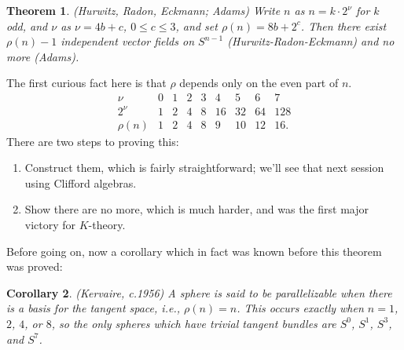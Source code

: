 \documentclass{article}
\newtheorem{thm}{Theorem}[section]
\newtheorem{cor}[thm]{Corollary}
\begin{document}
\begin{thm}(Hurwitz, Radon, Eckmann; Adams)
Write $n$ as $n = k \cdot 2^\nu$ for $k$ odd, and $\nu$ as $\nu = 4b + c$, $0 \le c \le 3$, and set $\rho(n) = 8b + 2^c$.  Then there exist $\rho(n) - 1$ independent vector fields on $S^{n-1}$ (Hurwitz-Radon-Eckmann) and no more (Adams).
\end{thm}
The first curious fact here is that $\rho$ depends only on the even part of $n$.
\[\begin{array}{c|cccccccc}
\nu & 0 & 1 & 2 & 3 & 4 & 5 & 6 & 7 \\
2^\nu & 1 & 2 & 4 & 8 & 16 & 32 & 64 & 128 \\
\hline
\rho(n) & 1 & 2 & 4 & 8 & 9 & 10 & 12 & 16.
\end{array}\]
There are two steps to proving this:
\begin{enumerate} %
\item Construct them, which is fairly straightforward; we'll see that next session using Clifford algebras.
\item Show there are no more, which is much harder, and was the first major victory for $K$-theory.
\end{enumerate}
Before going on, now a corollary which in fact was known before this theorem was proved:
\begin{cor}(Kervaire, c.1956)
A sphere is said to be parallelizable when there is a basis for the tangent space, i.e., $\rho(n) = n$.  This occurs exactly when $n = 1$, $2$, $4$, or $8$, so the only spheres which have trivial tangent bundles are $S^0$, $S^1$, $S^3$, and $S^7$.
\end{cor}
\end{document}
